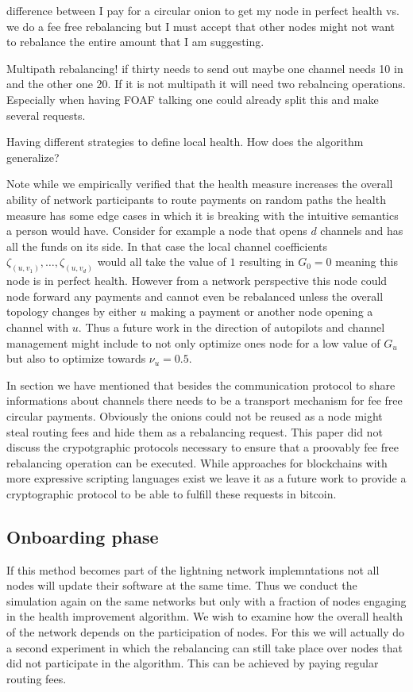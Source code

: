 \documentclass[a4paper]{paper}
\begin{document}
difference between I pay for a circular onion to get my node in perfect health vs. we do a fee free rebalancing but I must accept that other nodes might not want to rebalance the entire amount that I am suggesting.

Multipath rebalancing! if thirty needs to send out maybe one channel needs 10 in and the other one 20. If it is not multipath it will need two rebalncing operations. Especially when having FOAF talking one could already split this and make several requests.

Having different strategies to define local health. How does the algorithm generalize? 

Note while we empirically verified that the health measure increases the overall ability of network participants to route payments on random paths the health measure has some edge cases in which it is breaking with the intuitive semantics a person would have.
Consider for example a node that opens $d$ channels and has all the funds on its side.
In that case the local channel coefficients $\zeta_{(u,v_1)},\dots,\zeta_{(u,v_d)}$ would all take the value of $1$ resulting in $G_0 = 0$ meaning this node is in perfect health.
However from a network perspective this node could node forward any payments and cannot even be rebalanced unless the overall topology changes by either $u$ making a payment or another node opening a channel with $u$.
Thus a future work in the direction of autopilots and channel management might include to not only optimize ones node for a low value of $G_u$ but also to optimize towards $\nu_u = 0.5$.

In section we have mentioned that besides the communication protocol to share informations about channels there needs to be a transport mechanism for fee free circular payments.
Obviously the onions could not be reused as a node might steal routing fees and hide them as a rebalancing request.
This paper did not discuss the crypotgraphic protocols necessary to ensure that a proovably fee free rebalancing operation can be executed.
While approaches for blockchains with more expressive scripting languages exist \cite{khalil2017revive} we leave it as a future work to provide a cryptographic protocol to be able to fulfill these requests in bitcoin.


\subsection{Onboarding phase}
If this method becomes part of the lightning network implemntations not all nodes will update their software at the same time.
Thus we conduct the simulation again on the same networks but only with a fraction of nodes engaging in the health improvement algorithm.
We wish to examine how the overall health of the network depends on the participation of nodes.
For this we will actually do a second experiment in which the rebalancing can still take place over nodes that did not participate in the algorithm.
This can be achieved by paying regular routing fees.
\end{document}
